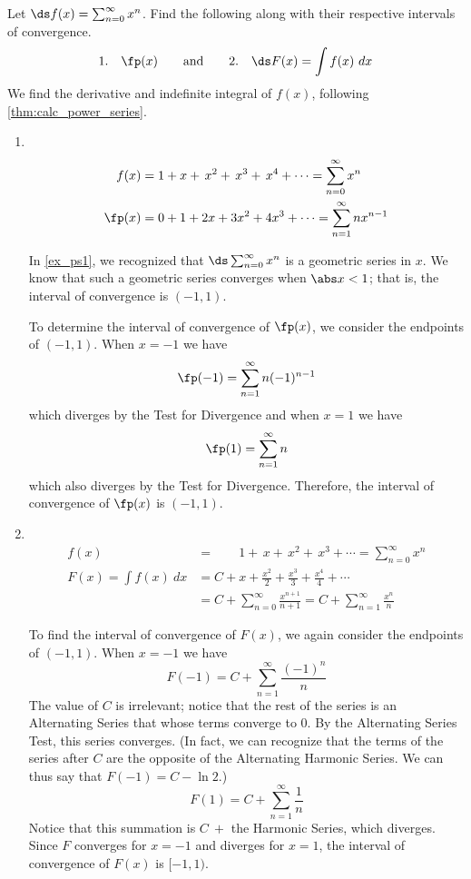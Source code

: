 \begin{example}\label{ex_ps3}
Let $\ds f(x) = \sum_{n=0}^\infty x^n$. Find the following along with their respective intervals of convergence.
\[
 \text{1.}\quad\fp(x)
 \qquad\text{and}\qquad
 \text{2.}\quad\ds F(x) =\int f(x)\ dx
\]
\solution
We find the derivative and indefinite integral of $f(x)$, following \autoref{thm:calc_power_series}.

\begin{enumerate}
\item\mbox{}\\[-3\baselineskip]
\begin{align*}
f(x)&=1+x+\,x^2+\,x^3+\,x^4+\dotsb = \sum_{n=0}^\infty x^n\\
\fp(x) &= 0+1+2x+3x^2+4x^3+\dotsb=\sum_{n=1}^\infty nx^{n-1} 
\end{align*}

In \autoref{ex_ps1}, we recognized that $\ds \sum_{n=0}^\infty x^n$ is a geometric series in $x$. We know that such a geometric series converges when $\abs x<1$; that is, the interval of convergence is $(-1,1)$.

To determine the interval of convergence of $\fp(x)$, we consider the endpoints of $(-1,1)$.
When $x=-1$ we have
\[\fp(-1) = \sum_{n=1}^\infty n(-1)^{n-1}\]
which diverges by the Test for Divergence
and when $x=1$ we have
\[\fp(1) = \sum_{n=1}^\infty n\]
which also diverges by the Test for Divergence. Therefore, the interval of convergence of $\fp(x)$ is $(-1,1)$. 

\item\mbox{}\\[-3\baselineskip]
\begin{align*}
 f(x)&=\phantom{C+{}}1+\,x+\,x^2+\,x^3+\dotsb = \sum_{n=0}^\infty x^n\\
 F(x) = \int f(x)\ dx &= C+ x+\frac{x^2}{2}+\frac{x^3}3+\frac{x^4}4+\dotsb \\
 &= C+\sum_{n=0}^\infty \frac{x^{n+1}}{n+1}=C+\sum_{n=1}^\infty \frac{x^{n}}{n}  
\end{align*}

To find the interval of convergence of $F(x)$, we again consider the endpoints of $(-1,1)$.
When $x=-1$ we have
\[F(-1) = C+\sum_{n=1}^\infty \frac{(-1)^{n}}{n}\]
The value of $C$ is irrelevant; notice that the rest of the series is an Alternating Series that whose terms converge to 0. By the Alternating Series Test, this series converges. (In fact, we can recognize that the terms of the series after $C$ are the opposite of the Alternating Harmonic Series. We can thus say that $F(-1) = C-\ln 2$.)
\[F(1) = C+\sum_{n=1}^\infty \frac{1}{n} \]
Notice that this summation is $C\ +$ the Harmonic Series, which diverges. Since $F$ converges for $x=-1$ and diverges for $x=1$, the interval of convergence of $F(x)$ is $[-1,1)$.
\end{enumerate}
\end{example}

